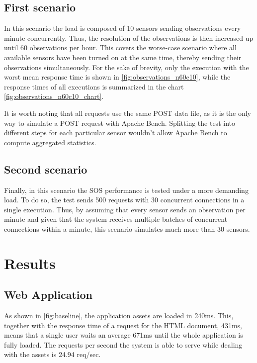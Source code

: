 \subsection*{First scenario}

In this scenario the load is composed of 10 sensors sending observations every minute concurrently. Thus, the resolution of the observations is then increased up until 60 observations per hour. This covers the worse-case scenario where all available sensors have been turned on at the same time, thereby sending their observations simultaneously. For the sake of brevity, only the execution with the worst mean response time is shown in \ref{fig:observations_n60c10}, while the response times of all executions is summarized in the chart \ref{fig:observations_n60c10_chart}.

It is worth noting that all requests use the same POST data file, as it is the only way to simulate a POST request with Apache Bench. Splitting the test into different steps for each particular sensor wouldn't allow Apache Bench to compute aggregated statistics.

\subsection*{Second scenario}

Finally, in this scenario the SOS performance is tested under a more demanding load. To do so, the test sends 500 requests with 30 concurrent connections in a single execution. Thus, by assuming that every sensor sends an observation per minute and given that the system receives multiple batches of concurrent connections within a minute, this scenario simulates much more than 30 sensors.

\section{Results}

\subsection*{Web Application}

As shown in \ref{fig:baseline}, the application assets are loaded in 240ms. This, together with the response time of a request for the HTML document, 431ms, means that a single user waits an average 671ms until the whole application is fully loaded. The requests per second the system is able to serve while dealing with the assets is 24.94 req/sec.

